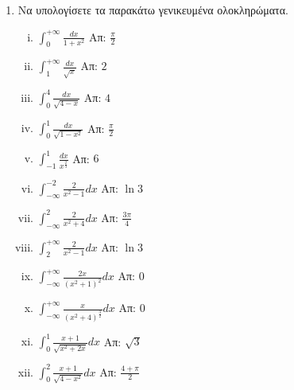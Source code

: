 



\pagestyle{askhseis}
\everymath{\displaystyle}




\begin{center}
  \minibox{\large \bfseries \textcolor{Col1}{Ασκήσεις στα Γενικευμένα Ολοκληρώματα}}
\end{center}

\vspace{\baselineskip}


\begin{enumerate}

\item Να υπολογίσετε τα παρακάτω γενικευμένα ολοκληρώματα.

\begin{enumerate}[i)]

\item $\int_{0}^{+\infty} \frac{dx}{1+x^2}$ \hfill Απ: $\frac{\pi}{2}$

\item $\int_{1}^{+\infty}\frac{dx}{\sqrt{x}}$ \hfill Απ: $2$

\item $\int_{0}^{4}\frac{dx}{\sqrt{4-x}}$ \hfill Απ: $4$

\item $\int_{0}^{1}\frac{dx}{\sqrt{1-x^2}}$ \hfill Απ: $\frac{\pi}{2}$

\item $\int_{-1}^{1}\frac{dx}{x^{\frac{2}{3}}}$ \hfill Απ: $6$

\item $\int_{-\infty}^{-2}\frac{2}{x^2-1}dx$ \hfill Απ: $\ln 3$

\item $\int_{-\infty}^{2}\frac{2}{x^2+4}dx$ \hfill Απ: $\frac{3\pi}{4}$

\item $\int_{2}^{+\infty}\frac{2}{x^2-1}dx$ \hfill Απ: $\ln 3$

\item $\int_{-\infty}^{+\infty}\frac{2x}{(x^2+1)^2}dx$ \hfill Απ: $0$

\item $\int_{-\infty}^{+\infty}\frac{x}{(x^2+4)^{\frac{3}{2}}}dx$ \hfill Απ: $0$

\item $\int_{0}^{1}\frac{x+1}{\sqrt{x^2+2x}}dx$ \hfill Απ: $\sqrt{3}$

\item $\int_{0}^{2}\frac{x+1}{\sqrt{4-x^2}}dx$ \hfill Απ: $\frac{4+\pi}{2}$


\end{enumerate}
\end{enumerate}
